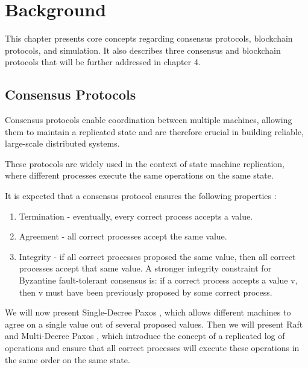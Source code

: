 

\chapter{Background}
\label{cha:background}

\glsresetall

This chapter presents core concepts regarding consensus protocols, blockchain protocols, and simulation. It also describes three consensus and blockchain protocols that will be further addressed in chapter 4.


\section{Consensus Protocols}
\label{sec:consensus_protocols}

Consensus protocols enable coordination between multiple machines, allowing them to maintain a replicated state and are therefore crucial in building reliable, large-scale distributed systems.

These protocols are widely used in the context of state machine replication, where different processes execute the same operations on the same state.

It is expected that a consensus protocol ensures the following properties \cite{dist_sys_book}:

\begin{enumerate}
  \item Termination - eventually, every correct process accepts a value.
  \item Agreement - all correct processes accept the same value.
  \item Integrity - if all correct processes proposed the same value, then all correct processes accept that same value. A stronger integrity constraint for Byzantine fault-tolerant consensus is: if a correct process accepts a value v, then v must have been previously proposed by some correct process.
\end{enumerate}

We will now present Single-Decree Paxos \cite{paxos_made_simple}, which allows different machines to agree on a single value out of several proposed values. Then we will present  Raft \cite{paxos_vs_raft}\cite{raft} and Multi-Decree Paxos \cite{paxos_vs_raft}\cite{paxos_complex}\cite{paxos_live}, which introduce the concept of a replicated log of operations and ensure that all correct processes will execute these operations in the same order on the same state.

